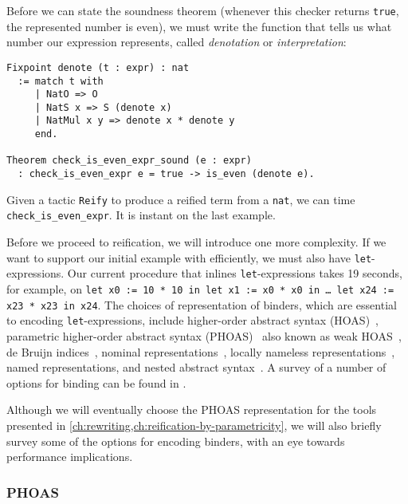 Before we can state the soundness theorem (whenever this checker returns \texttt{true}, the represented number is even), we must write the function that tells us what number our expression represents, called \emph{denotation} or \emph{interpretation}:
\begin{verbatim}
Fixpoint denote (t : expr) : nat
  := match t with
     | NatO => O
     | NatS x => S (denote x)
     | NatMul x y => denote x * denote y
     end.

Theorem check_is_even_expr_sound (e : expr)
  : check_is_even_expr e = true -> is_even (denote e).
\end{verbatim}

Given a tactic \texttt{Reify} to produce a reified term from a \texttt{nat}, we can time \texttt{check_is_even_expr}.
It is instant on the last example.%

Before we proceed to reification, we will introduce one more complexity.
If we want to support our initial example with \space efficiently, we must also have \texttt{let}-expressions.
Our current procedure that inlines \texttt{let}-expressions takes 19 seconds, for example, on \texttt{let x0 := 10 * 10 in let x1 := x0 * x0 in … let x24 := x23 * x23 in x24}.
The choices of representation of binders, which are essential to encoding \texttt{let}-expressions, include higher-order abstract syntax (HOAS)~\cite{HOAS}, parametric higher-order abstract syntax (PHOAS)~\cite{PhoasICFP08} also known as weak HOAS~\cite{weak2013Ciaffaglione}, de Bruijn indices~\cite{debruijn1972}, nominal representations~\cite{Nominal2003Pitts}, locally nameless representations~\cite{Locally2012Chargueraud,locally2007Leroy}, named representations, and nested abstract syntax~\cite{Nested2012Hirschowitz,deBruijn1999Bird}.
A survey of a number of options for binding can be found in \autocite{Engineering2008Aydemir}.

Although we will eventually choose the PHOAS representation for the tools presented in \autoref{ch:rewriting,ch:reification-by-parametricity}, we will also briefly survey some of the options for encoding binders, with an eye towards performance implications.

\subsubsection{PHOAS} \label{sec:binders:PHOAS}

